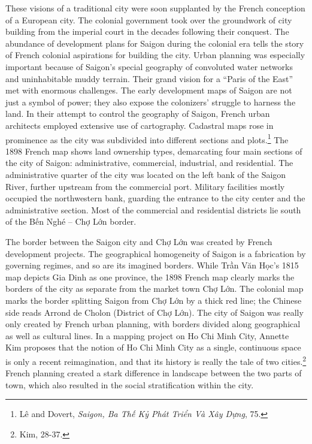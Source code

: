 These visions of a traditional city were soon supplanted by the French conception of a European city. The colonial government took over the groundwork of city building from the imperial court in the decades following their conquest. The abundance of development plans for Saigon during the colonial era tells the story of French colonial aspirations for building the city. Urban planning was especially important because of Saigon’s special geography of convoluted water networks and uninhabitable muddy terrain. Their grand vision for a “Paris of the East” met with enormous challenges. The early development maps of Saigon are not just a symbol of power; they also expose the colonizers’ struggle to harness the land. In their attempt to control the geography of Saigon, French urban architects employed extensive use of cartography. Cadastral maps rose in prominence as the city was subdivided into different sections and plots.\footnote{Lê and Dovert, \textit{Saigon, Ba Thế Kỷ Phát Triển Và Xây Dựng}, 75.} The 1898 French map shows land ownership types, demarcating four main sections of the city of Saigon: administrative, commercial, industrial, and residential. The administrative quarter of the city was located on the left bank of the Saigon River, further upstream from the commercial port. Military facilities mostly occupied the northwestern bank, guarding the entrance to the city center and the administrative section. Most of the commercial and residential districts lie south of the Bến Nghé – Chợ Lớn border.

The border between the Saigon city and Chợ Lớn was created by French development projects. The geographical homogeneity of Saigon is a fabrication by governing regimes, and so are its imagined borders. While Trần Văn Học’s 1815 map depicts Gia Dinh as one province, the 1898 French map clearly marks the borders of the city as separate from the market town Chợ Lớn. The colonial map marks the border splitting Saigon from Chợ Lớn by a thick red line; the Chinese side reads Arrond de Cholon (District of Chợ Lớn). The city of Saigon was really only created by French urban planning, with borders divided along geographical as well as cultural lines. In a mapping project on Ho Chi Minh City, Annette Kim proposes that the notion of Ho Chi Minh City as a single, continuous space is only a recent reimagination, and that its history is really the tale of two cities.\footnote{Kim, 28-37.} French planning created a stark difference in landscape between the two parts of town, which also resulted in the social stratification within the city.

